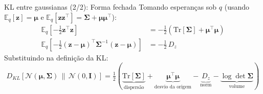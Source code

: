 \documentclass[aspectratio=169,xcolor=dvipsnames]{beamer}
\begin{document}
  \begin{frame}{KL entre gaussianas (2/2): Forma fechada}
    Tomando esperanças sob $q$ (usando
    $\mathbb{E}_q[\mathbf{z}] = \boldsymbol{\mu}$ e $\mathbb{E}_q[\mathbf{z}\mathbf{z}^{\top}] = \boldsymbol{\Sigma} + \boldsymbol{\mu}\boldsymbol{\mu}^{\top}$):
    \vspace{0.3em}
    \begin{align*}
      \mathbb{E}_{q}\!\left[-\tfrac{1}{2}\mathbf{z}^{\top}\mathbf{z}\right]
      &= -\tfrac{1}{2}\!\left(\mathrm{Tr}[\boldsymbol{\Sigma}] + \boldsymbol{\mu}^{\top}\boldsymbol{\mu}\right) \\[0.2em]
      \mathbb{E}_{q}\!\left[-\tfrac{1}{2}(\mathbf{z}-\boldsymbol{\mu})^{\top}\boldsymbol{\Sigma}^{-1}(\mathbf{z}-\boldsymbol{\mu})\right]
      &= -\tfrac{1}{2}\,D_z
    \end{align*}
    \vspace{0.2em}
    Substituindo na definição da KL:
    \[
      \boxed{
        D_{KL}\!\left[\mathcal{N}(\boldsymbol{\mu},\boldsymbol{\Sigma})\,\|\,\mathcal{N}(0,\mathbf{I})\right]
        = \tfrac{1}{2}\!\left(
          \underbrace{\mathrm{Tr}[\boldsymbol{\Sigma}]}_{\text{dispersão}}
          + \underbrace{\boldsymbol{\mu}^{\!\top}\boldsymbol{\mu}}_{\text{desvio da origem}}
          - \underbrace{D_{z}}_{\text{norm}}
          - \underbrace{\log\det\boldsymbol{\Sigma}}_{\text{volume}}
        \right)
      }
    \]
  \end{frame}
\end{document}
